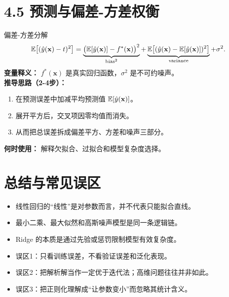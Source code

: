 ﻿\documentclass[11pt]{article}
\begin{document}
\section{4.5 预测与偏差-方差权衡}
\begin{formulabox}{偏差-方差分解}
\begin{equation}
\mathbb{E}\big[(\hat y(\mathbf x)-t)^2\big]
=
\underbrace{\big(\mathbb{E}[\hat y(\mathbf x)]-f^\ast(\mathbf x)\big)^2}_{\text{bias}^2}
+
\underbrace{\mathbb{E}\big[(\hat y(\mathbf x)-\mathbb{E}[\hat y(\mathbf x)])^2\big]}_{\text{variance}}
+\sigma^2.
\end{equation}
\textbf{变量释义：} $f^\ast(\mathbf x)$ 是真实回归函数，$\sigma^2$ 是不可约噪声。\\
\textbf{推导思路（2-4步）：}
\begin{enumerate}[leftmargin=1.6em]
  \item 在预测误差中加减平均预测值 $\mathbb{E}[\hat y(\mathbf x)]$。
  \item 展开平方后，交叉项因零均值而消失。
  \item 从而把总误差拆成偏差平方、方差和噪声三部分。
\end{enumerate}
\textbf{何时使用：} 解释欠拟合、过拟合和模型复杂度选择。
\end{formulabox}

\section{总结与常见误区}
\begin{itemize}[leftmargin=1.6em]
  \item 线性回归的“线性”是对参数而言，并不代表只能拟合直线。
  \item 最小二乘、最大似然和高斯噪声模型是同一条逻辑链。
  \item Ridge 的本质是通过先验或惩罚限制模型有效复杂度。
  \item 误区1：只看训练误差，不看验证误差和泛化表现。
  \item 误区2：把解析解当作一定优于迭代法；高维问题往往并非如此。
  \item 误区3：把正则化理解成“让参数变小”而忽略其统计含义。
\end{itemize}
\end{document}
